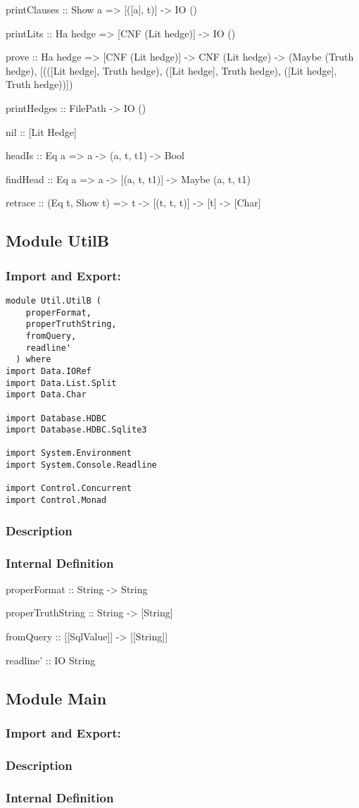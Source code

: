 \documentclass[../gr-final.tex]{subfiles}
\begin{document}
printClauses :: Show a => [([a], t)] -> IO ()

printLits :: Ha hedge => [CNF (Lit hedge)] -> IO ()

prove :: Ha hedge => [CNF (Lit hedge)] -> CNF (Lit hedge) ->
(Maybe (Truth hedge), [(([Lit hedge], Truth hedge), ([Lit hedge],
Truth hedge), ([Lit hedge], Truth hedge))])

printHedges :: FilePath -> IO ()

nil :: [Lit Hedge]

headIs :: Eq a => a -> (a, t, t1) -> Bool

findHead :: Eq a => a -> [(a, t, t1)] -> Maybe (a, t, t1)

retrace :: (Eq t, Show t) => t -> [(t, t, t)] -> [t] -> [Char]
\subsection{Module UtilB}
\subsubsection{Import and Export:}
\begin{lstlisting}
module Util.UtilB (
    properFormat,
    properTruthString,
    fromQuery,
    readline'
  ) where
import Data.IORef
import Data.List.Split
import Data.Char

import Database.HDBC
import Database.HDBC.Sqlite3

import System.Environment
import System.Console.Readline

import Control.Concurrent
import Control.Monad
\end{lstlisting}
\subsubsection{Description}

\subsubsection{Internal Definition}
properFormat :: String -> String

properTruthString :: String -> [String]

fromQuery :: [[SqlValue]] -> [[String]]

readline' :: IO String

\subsection{Module Main}
\subsubsection{Import and Export:}
\subsubsection{Description}
\subsubsection{Internal Definition}
\end{document}
